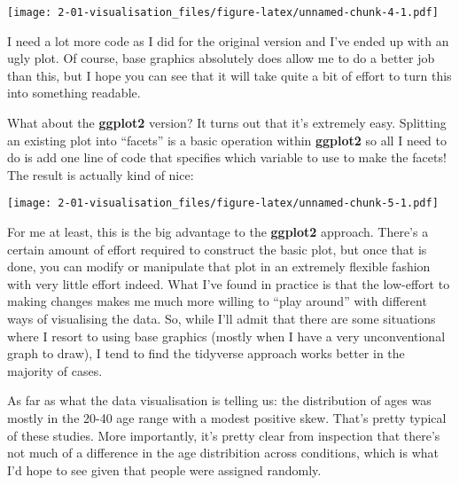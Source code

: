 \documentclass[]{book}
\newenvironment{Shaded}{\begin{snugshade}}{\end{snugshade}}
\newcommand{\DataTypeTok}[1]{\textcolor[rgb]{0.13,0.29,0.53}{#1}}
\newcommand{\KeywordTok}[1]{\textcolor[rgb]{0.13,0.29,0.53}{\textbf{#1}}}
\newcommand{\NormalTok}[1]{#1}
\newcommand{\OperatorTok}[1]{\textcolor[rgb]{0.81,0.36,0.00}{\textbf{#1}}}
\newcommand{\StringTok}[1]{\textcolor[rgb]{0.31,0.60,0.02}{#1}}
\begin{document}
\texttt{[image: 2-01-visualisation\_files/figure-latex/unnamed-chunk-4-1.pdf]}

I need a lot more code as I did for the original version and I've ended up with an ugly plot. Of course, base graphics absolutely does allow me to do a better job than this, but I hope you can see that it will take quite a bit of effort to turn this into something readable.

What about the \textbf{ggplot2} version? It turns out that it's extremely easy. Splitting an existing plot into ``facets'' is a basic operation within \textbf{ggplot2} so all I need to do is add one line of code that specifies which variable to use to make the facets!
The result is actually kind of nice:

\begin{Shaded}
\end{Shaded}

\texttt{[image: 2-01-visualisation\_files/figure-latex/unnamed-chunk-5-1.pdf]}

For me at least, this is the big advantage to the \textbf{ggplot2} approach. There's a certain amount of effort required to construct the basic plot, but once that is done, you can modify or manipulate that plot in an extremely flexible fashion with very little effort indeed. What I've found in practice is that the low-effort to making changes makes me much more willing to ``play around'' with different ways of visualising the data. So, while I'll admit that there are some situations where I resort to using base graphics (mostly when I have a very unconventional graph to draw), I tend to find the tidyverse approach works better in the majority of cases.

As far as what the data visualisation is telling us: the distribution of ages was mostly in the 20-40 age range with a modest positive skew. That's pretty typical of these studies. More importantly, it's pretty clear from inspection that there's not much of a difference in the age distribition across conditions, which is what I'd hope to see given that people were assigned randomly.
\end{document}
